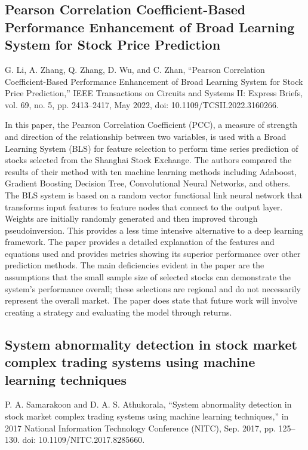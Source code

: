 \documentclass[12pt]{article}
\begin{document}
\subsection{Pearson Correlation Coefficient-Based Performance Enhancement of Broad Learning System for Stock Price Prediction}
G. Li, A. Zhang, Q. Zhang, D. Wu, and C. Zhan, “Pearson Correlation Coefficient-Based Performance Enhancement of Broad Learning System for Stock Price Prediction,” IEEE Transactions on Circuits and Systems II: Express Briefs, vol. 69, no. 5, pp. 2413–2417, May 2022, doi: 10.1109/TCSII.2022.3160266.
\newline

In this paper, the Pearson Correlation Coefficient (PCC), a measure of strength and direction of the relationship between two variables, is used with a Broad Learning System (BLS) for feature selection to perform time series prediction of stocks selected from the Shanghai Stock Exchange. The authors compared the results of their method with ten machine learning methods including Adaboost, Gradient Boosting Decision Tree, Convolutional Neural Networks, and others. The BLS system is based on a random vector functional link neural network that transforms input features to feature nodes that connect to the output layer. Weights are initially randomly generated and then improved through pseudoinversion. This provides a less time intensive alternative to a deep learning framework. The paper provides a detailed explanation of the features and equations used and provides metrics showing its superior performance over other prediction methods. The main deficiencies evident in the paper are the assumptions that the small sample size of selected stocks can demonstrate the system's performance overall; these selections are regional and do not necessarily represent the overall market. The paper does state that future work will involve creating a strategy and evaluating the model through returns.


\subsection{System abnormality detection in stock market complex trading systems using machine learning techniques}
P. A. Samarakoon and D. A. S. Athukorala, “System abnormality detection in stock market complex trading systems using machine learning techniques,” in 2017 National Information Technology Conference (NITC), Sep. 2017, pp. 125–130. doi: 10.1109/NITC.2017.8285660.
\newline
\end{document}
